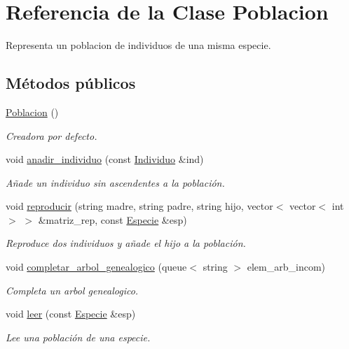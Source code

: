 \hypertarget{class_poblacion}{}\section{Referencia de la Clase Poblacion}
\label{class_poblacion}


Representa un poblacion de individuos de una misma especie.  


\subsection*{Métodos públicos}
\begin{DoxyCompactItemize}
\item 
\hyperlink{class_poblacion_ad3909b6ea27344b861b7cd548cb2b65e}{Poblacion} ()
\begin{DoxyCompactList}\small\item\em Creadora por defecto. \end{DoxyCompactList}\item 
void \hyperlink{class_poblacion_a4622ccceef105548460351376791f8f6}{anadir\+\_\+individuo} (const \hyperlink{class_individuo}{Individuo} \&ind)
\begin{DoxyCompactList}\small\item\em Añade un individuo sin ascendentes a la población. \end{DoxyCompactList}\item 
void \hyperlink{class_poblacion_a83e45d5057cb4496647d0aed76071876}{reproducir} (string madre, string padre, string hijo, vector$<$ vector$<$ int $>$ $>$ \&matriz\+\_\+rep, const \hyperlink{class_especie}{Especie} \&esp)
\begin{DoxyCompactList}\small\item\em Reproduce dos individuos y añade el hijo a la población. \end{DoxyCompactList}\item 
void \hyperlink{class_poblacion_a2dd7bd82d100852ad3767d5830fe932a}{completar\+\_\+arbol\+\_\+genealogico} (queue$<$ string $>$ elem\+\_\+arb\+\_\+incom)
\begin{DoxyCompactList}\small\item\em Completa un arbol genealogico. \end{DoxyCompactList}\item 
void \hyperlink{class_poblacion_a94a32410a0d2b2066b0d7203efbf673f}{leer} (const \hyperlink{class_especie}{Especie} \&esp)
\begin{DoxyCompactList}\small\item\em Lee una población de una especie. \end{DoxyCompactList}\item 

\end{DoxyCompactItemize}
